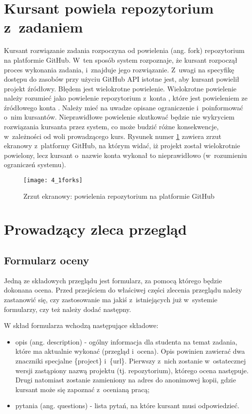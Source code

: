 \section{Kursant powiela repozytorium z~zadaniem}
Kursant rozwiązanie zadania rozpoczyna od powielenia (ang. fork) repozytorium na platformie GitHub. W~ten sposób system rozpoznaje, że kursant rozpoczął proces wykonania zadania, i~znajduje jego rozwiązanie. Z~uwagi na specyfikę dostępu do zasobów przy użyciu GitHub API istotne jest, aby kursant powielił projekt źródłowy. Błędem jest wielokrotne powielenie. Wielokrotne powielenie należy rozumieć jako powielenie repozytorium z~konta , które jest powieleniem ze źródłowego konta . Należy mieć na uwadze opisane ograniczenie i~poinformować o~nim kursantów. Nieprawidłowe powielenie skutkować będzie nie wykryciem rozwiązania kursanta przez system, co może budzić różne konsekwencje, w~zależności od woli prowadzącego kurs. Rysunek numer \ref{obr41} zawiera zrzut ekranowy z~platformy GitHub, na którym widać, iż projekt został wielokrotnie powielony, lecz kursant o~nazwie konta  wykonał to nieprawidłowo (w~rozumieniu ograniczeń systemu).

\begin{figure}[!h]
\centering
    \texttt{[image: 4\_1forks]}
    \caption{Zrzut ekranowy: powielenia repozytorium na platformie GitHub}
    \label{obr41}
\end{figure}

\clearpage
\section{Prowadzący zleca przegląd}

\subsection{Formularz oceny}
Jedną ze składowych przeglądu jest formularz, za pomocą którego będzie dokonana ocena. Przed przejściem do właściwej części zlecenia przeglądu należy zastanowić się, czy zastosowanie ma jakiś z~istniejących już w~systemie formularzy, czy też należy dodać następny. 

\medskip
W skład formularza wchodzą następujące składowe:
\begin{itemize}
    \item opis (ang. description) - ogólny informacja dla studenta na temat zadania, które ma aktualnie wykonać (przegląd i~ocena). Opis powinien zawierać dwa znaczniki specjalne \{project\} i~\{url\}. Pierwszy z~nich zostanie w~ostatecznej wersji zastąpiony nazwą projektu (tj. repozytorium), którego ocena następuje. Drugi natomiast zostanie zamieniony na adres do anonimowej kopii, gdzie kursant może się zapoznać z~ocenianą pracą;
    \item pytania (ang. questions) - lista pytań, na które kursant musi odpowiedzieć.
\end{itemize}

